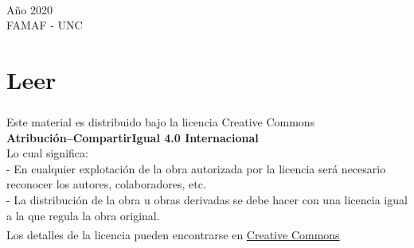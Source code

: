 \documentclass[a4paper,12pt,twoside,spanish,reqno,dottedtoc]{scrbook}
\begin{document}
	
	\begin{titlepage}
		
		\begin{addmargin}[-1cm]{-3cm}
			\begin{center}
				\large
				
				\hfill
				\vfill
				
				\begingroup
				\color{Maroon} \\ \bigskip %
				\endgroup
				
				
				\vfill
				
		
				
				Año 2020   \\ FAMAF  - UNC\\ \medskip %
				
				
				\vfill
				
			\end{center}
		\end{addmargin}
		
	\end{titlepage}
	


	
	\begingroup

	\let\clearpage\relax
	\let\cleardoublepage\relax
	\let\cleardoublepage\relax
	
	\chapter*{Leer}
	
	

	${}^{}$\\
	{\flushleft 
		Este material es distribuido bajo la licencia Creative Commons} \\
		\center  	\textbf{Atribución--CompartirIgual 4.0 Internacional}
	\\ 
	\center  Lo cual significa: 
	\\
	\flushleft
	- En cualquier explotación de la obra autorizada por la licencia será necesario reconocer los autores, colaboradores, etc.\\
	- La distribución de la obra u obras derivadas se debe hacer con una licencia igual a la que regula la obra original.\\
	${}^{}$
	\\
	Los detalles de la licencia pueden encontrarse en \href{https://creativecommons.org/licenses/by/4.0/deed.es}{Creative Commons}
	\vskip 1cm 
	\endgroup
\end{document}
